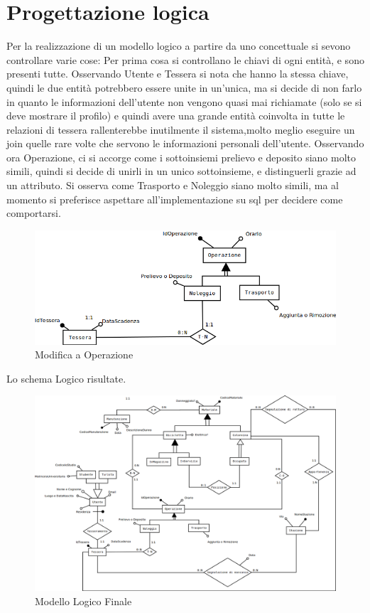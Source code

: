 \documentclass[a4paper,twoside]{article}
\begin{document}
\section{Progettazione logica}
Per la realizzazione di un modello logico a partire da uno concettuale si sevono controllare varie cose:\newline
Per prima cosa si controllano le chiavi di ogni entità, e sono presenti tutte.\newline
Osservando Utente e Tessera si nota che hanno la stessa chiave, quindi le due entità potrebbero essere unite in un'unica, ma si decide di non farlo in quanto le informazioni dell'utente non vengono quasi mai richiamate (solo se si deve mostrare il profilo) e quindi avere una grande entità coinvolta in tutte le relazioni di tessera rallenterebbe inutilmente il sistema,molto meglio eseguire un join quelle rare volte che servono le informazioni personali dell'utente.\newline
Osservando ora Operazione, ci si accorge come i sottoinsiemi prelievo e deposito siano molto simili, quindi si decide di unirli in un unico sottoinsieme, e distinguerli grazie ad un attributo.\newline
Si osserva come Trasporto e Noleggio siano molto simili, ma al momento si preferisce aspettare all'implementazione su sql per decidere come comportarsi.
\begin{figure}[H]
 \centering
  \includegraphics[width=1\textwidth]{Immagini-Grafici/Logico01.png}
\caption{Modifica a Operazione}
\end{figure}
Lo schema Logico risultate.
\begin{figure}[H]
 \centering
  \includegraphics[width=1\textwidth]{Immagini-Grafici/LogicoFinale.png}
\caption{Modello Logico Finale}
\end{figure}
\end{document}
